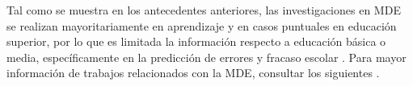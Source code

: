 












Tal como se muestra en los antecedentes anteriores, las investigaciones en MDE se realizan mayoritariamente en aprendizaje  y en casos puntuales en educación superior, por lo que es limitada la información respecto a educación básica o media, específicamente en la predicción de errores y fracaso escolar \parencite{marquez2013predicting}. Para mayor información de trabajos relacionados con la MDE, consultar los siguientes  \parencite{shahiri2015review,sukhija2015recent,anoopkumar2016review,dutt2017systematic}.